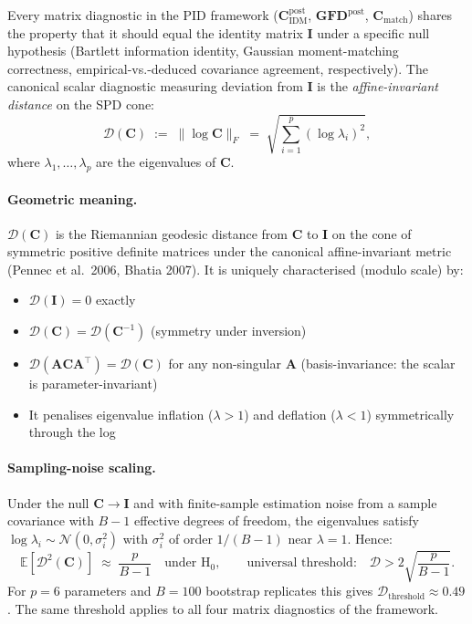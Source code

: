 \documentclass[11pt]{article}
\begin{document}
Every matrix diagnostic in the PID framework
($\mathbf C_{\mathrm{IDM}}^{\mathrm{post}}$, $\mathbf{GFD}^{\mathrm{post}}$,
$\mathbf C_{\mathrm{match}}$) shares the property that it should
equal the identity matrix $\mathbf I$ under a specific null hypothesis
(Bartlett information identity, Gaussian moment-matching correctness,
empirical-vs.-deduced covariance agreement, respectively). The
canonical scalar diagnostic measuring deviation from $\mathbf I$ is
the \emph{affine-invariant distance} on the SPD cone:
\begin{equation}
\boxed{\quad
\mathcal D(\mathbf C)
\;:=\;
\|\log \mathbf C\|_F
\;=\;
\sqrt{\sum_{i=1}^p (\log \lambda_i)^2},
\quad}
\label{eq:av-D-definition}
\end{equation}
where $\lambda_1,\ldots,\lambda_p$ are the eigenvalues of $\mathbf C$.

\paragraph{Geometric meaning.}
$\mathcal D(\mathbf C)$ is the Riemannian geodesic distance from
$\mathbf C$ to $\mathbf I$ on the cone of symmetric positive definite
matrices under the canonical affine-invariant metric (Pennec et al.\
2006, Bhatia 2007). It is uniquely characterised (modulo scale) by:
\begin{itemize}
\item $\mathcal D(\mathbf I) = 0$ exactly
\item $\mathcal D(\mathbf C) = \mathcal D(\mathbf C^{-1})$ (symmetry under inversion)
\item $\mathcal D(\mathbf A \mathbf C \mathbf A^\top) = \mathcal D(\mathbf C)$
  for any non-singular $\mathbf A$ (basis-invariance: the scalar is
  parameter-invariant)
\item It penalises eigenvalue inflation ($\lambda > 1$) and deflation
  ($\lambda < 1$) symmetrically through the log
\end{itemize}

\paragraph{Sampling-noise scaling.}
Under the null $\mathbf C \to \mathbf I$ and with finite-sample
estimation noise from a sample covariance with $B-1$ effective degrees
of freedom, the eigenvalues satisfy $\log \lambda_i \sim \mathcal N(0,\sigma^2_i)$
with $\sigma^2_i$ of order $1/(B-1)$ near $\lambda = 1$. Hence:
\begin{equation}
\mathbb E[\mathcal D^2(\mathbf C)]
\;\approx\;
\frac{p}{B-1}
\quad\text{under H}_0,
\qquad
\text{universal threshold:}\quad
\mathcal D > 2\sqrt{\frac{p}{B-1}}.
\label{eq:av-D-threshold}
\end{equation}
For $p = 6$ parameters and $B = 100$ bootstrap replicates this gives
$\mathcal D_{\mathrm{threshold}} \approx 0.49$. The same threshold
applies to all four matrix diagnostics of the framework.
\end{document}
